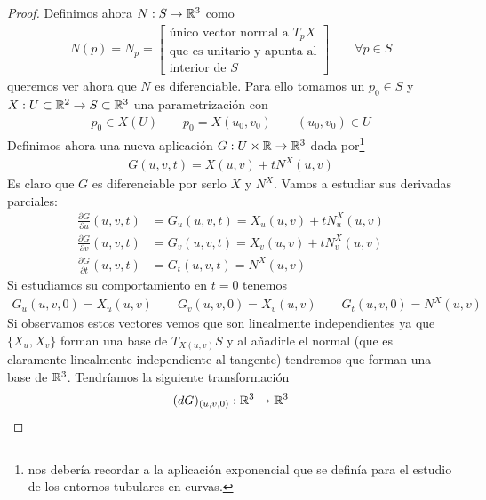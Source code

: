 \begin{teo}
\begin{proof}
        Definimos ahora $N:S\to \mathbb{R}^3$ como 
        \begin{gather*}
            N(p)=N_p =
            \left[
            \begin{array}{c}
                \text{único vector normal a $T_pX$}\\
                \text{que es unitario y apunta al}\\
                \text{interior de $S$}
            \end{array}
            \right]
            \qquad \forall p\in S
        \end{gather*}
        queremos ver ahora que $N$ es diferenciable. Para ello tomamos un $p_0\in S$ y $X:U\subset \mathbb{R}^2 \to S\subset \mathbb{R}^3$ una parametrización con
        \begin{gather*}
            p_0\in X(U) \qquad p_0=X(u_0,v_0) \qquad (u_0,v_0)\in U
        \end{gather*}
        Definimos ahora una nueva aplicación $G:U\times \mathbb{R} \to \mathbb{R}^3$ dada por\footnote{nos debería recordar a la aplicación exponencial que se definía para el estudio de los entornos tubulares en curvas.}
        \begin{gather*}
            G(u,v,t) = X(u,v) + tN^X(u,v)
        \end{gather*}
        Es claro que $G$ es diferenciable por serlo $X$ y $N^X$. Vamos a estudiar sus derivadas parciales:
        \begin{align*}
            \frac{\partial G}{\partial u} (u,v,t) &= G_u(u,v,t) = X_u(u,v) + t N^X_u(u,v)\\[1em]
            \frac{\partial G}{\partial v} (u,v,t) &= G_v(u,v,t) = X_v(u,v) + t N^X_v(u,v)\\[1em]
            \frac{\partial G}{\partial t} (u,v,t) &= G_t(u,v,t) = N^X(u,v)
        \end{align*}
        Si estudiamos su comportamiento en $t=0$ tenemos
        \begin{gather*}
            G_u(u,v,0) = X_u(u,v)\qquad
            G_v(u,v,0) = X_v(u,v)\qquad
            G_t(u,v,0) = N^X(u,v)
        \end{gather*}
        Si observamos estos vectores vemos que son linealmente independientes ya que $\{X_u, X_v\}$ forman una base de $T_{X(u,v)}S$ y al añadirle el normal (que es claramente linealmente independiente al tangente) tendremos que forman una base de $\mathbb{R}^3$. Tendríamos la siguiente transformación
        \begin{align*}
            (dG)_{(u,v,0)} &: \bb{R}^3 \to \bb{R}^3\\

\end{align*}
\end{proof}
\end{teo}
